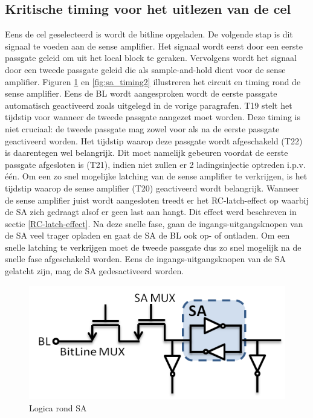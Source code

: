 \subsection{Kritische timing voor het uitlezen van de cel}
Eens de cel geselecteerd is wordt de bitline opgeladen. De volgende stap is dit signaal te voeden aan de sense amplifier. Het signaal wordt eerst door een eerste passgate geleid om uit het local block te geraken. Vervolgens wordt het signaal door een tweede passgate geleid die als sample-and-hold dient voor de sense amplifier. Figuren \ref{fig:sa_timing1} en \ref{fig:sa_timing2} illustreren het circuit en timing rond de sense amplifier. Eens de BL wordt aangesproken wordt de eerste passgate automatisch geactiveerd zoals uitgelegd in de vorige paragrafen. T19 stelt het tijdstip voor wanneer de tweede passgate aangezet moet worden. Deze timing is niet cruciaal: de tweede passgate mag zowel voor als na de eerste passgate geactiveerd worden. Het tijdstip waarop deze passgate wordt afgeschakeld (T22) is daarentegen wel belangrijk. Dit moet namelijk gebeuren voordat de eerste passgate afgesloten is (T21), indien niet zullen er 2 ladingsinjectie optreden i.p.v. één. Om een zo snel mogelijke latching van de sense amplifier te verkrijgen, is het tijdstip waarop de sense amplifier (T20) geactiveerd wordt belangrijk. Wanneer de sense amplifier juist wordt aangesloten treedt er het RC-latch-effect op waarbij de SA zich gedraagt alsof er geen last aan hangt. Dit effect werd beschreven in sectie \ref{RC-latch-effect}. Na deze snelle fase, gaan de ingangs-uitgangsknopen van de SA veel trager opladen en gaat de SA de BL ook op- of ontladen. Om een snelle latching te verkrijgen moet de tweede passgate dus zo snel mogelijk na de snelle fase afgeschakeld worden. Eens de ingangs-uitgangsknopen van de SA gelatcht zijn, mag de SA gedesactiveerd worden.

\begin{figure}[!ht]
  \centering
  \includegraphics[scale=0.6]{../fig/hfdstk-timing-sa1.png}
  \caption[SA:logica]{Logica rond SA}
  \label{fig:sa_timing1}
\end{figure}

